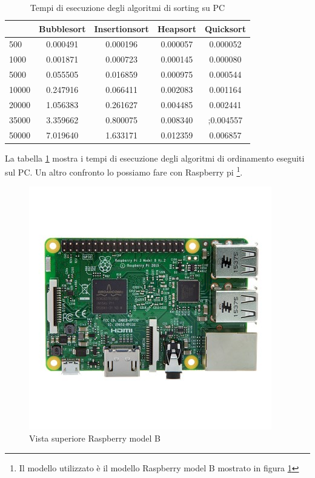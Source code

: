 \documentclass[12pt,a4paper]{report}
\begin{document}
	
	\begin{table}[ht]
		\centering
		\begin{tabular}		{| l | c | c | c | c |}
		\hline
		      & Bubblesort & Insertionsort & Heapsort & Quicksort \\ \hline
500   & 0.000491      & 0.000196      & 0.000057 & 0.000052     \\ \hline
1000  & 0.001871	    & 0.000723      & 0.000145 & 0.000080     \\ \hline
5000  & 0.055505      & 0.016859     & 0.000975  & 0.000544   \\ \hline
10000 & 0.247916      & 0.066411     & 0.002083 & 0.001164     \\ \hline
20000 & 1.056383   & 0.261627      & 0.004485  & 0.002441   \\ \hline
35000 & 3.359662     & 0.800075     & 0.008340  & ;0.004557   \\ \hline
50000 & 7.019640     & 1.633171   & 0.012359  & 0.006857  \\ \hline

		\end{tabular}
		\caption{Tempi di esecuzione degli algoritmi di sorting su PC}
		\label{Fig:PcSort}
	\end{table}

La tabella \ref{Fig:PcSort} mostra i tempi di esecuzione degli algoritmi di ordinamento eseguiti sul PC. 
Un altro confronto lo possiamo fare con Raspberry pi \footnote{Il modello utilizzato è il modello Raspberry model B mostrato in figura \ref{fig:RaspberryB} }.

\begin{figure}[ht]
\centering
	\includegraphics[scale=0.5 ]{RBTop.jpeg}
	\caption{Vista superiore Raspberry model B}
	\label{fig:RaspberryB}
\end{figure}
\end{document}
